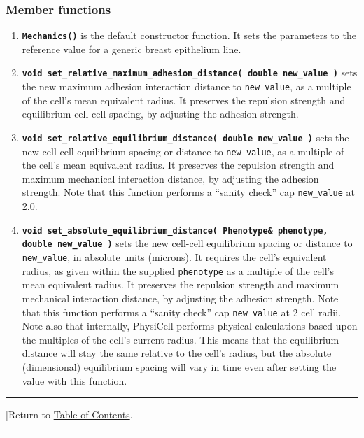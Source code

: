 \documentclass[12pt]{article}
\newcommand{\smallcode}[1]{\textbf{\texttt{#1}}}
\newcommand{\TOClink}{\begin{center}\hrule\vskip-10pt\phantom{.}\hfill[Return to \hyperlink{TOC}{Table of Contents}.]\hfill\phantom{.}\vskip3pt\hrule\end{center}}
\begin{document}
\subsubsection{Member functions}
\begin{enumerate}
\item 
\smallcode{Mechanics()} is the default constructor function. It sets the parameters to the reference value for 
a generic breast epithelium line.  


\item
\smallcode{void set\_relative\_maximum\_adhesion\_distance( double new\_value )} sets the new maximum 
adhesion interaction distance to \texttt{new\_value}, as a multiple of the cell's mean equivalent radius. It 
preserves the repulsion strength and equilibrium cell-cell spacing, by adjusting the adhesion strength. 

\item 
\smallcode{void set\_relative\_equilibrium\_distance( double new\_value )} sets the new cell-cell equilibrium 
spacing or distance to \texttt{new\_value}, as a multiple of the cell's mean equivalent radius. It 
preserves the repulsion strength and maximum mechanical interaction distance, 
by adjusting the adhesion strength. Note that this function performs a ``sanity check'' cap 
\texttt{new\_value} at 2.0. 


\item 
\smallcode{void set\_absolute\_equilibrium\_distance( Phenotype\& phenotype, double new\_value )}
 sets the new cell-cell equilibrium 
spacing or distance to \texttt{new\_value}, in absolute units (microns). It requires the cell's 
equivalent radius, as given within the supplied \texttt{phenotype}
 as a multiple of the cell's mean equivalent radius. It 
preserves the repulsion strength and maximum mechanical interaction distance, 
by adjusting the adhesion strength.  Note that this function performs a ``sanity check'' cap 
\texttt{new\_value} at 2 cell radii. Note also that internally, PhysiCell performs physical calculations 
based upon the multiples of the cell's current radius. This means that the equilibrium distance will 
stay the same relative to the cell's radius, but the absolute (dimensional) equilibrium spacing will 
vary in time even after setting the value with this function. 

\end{enumerate}

\TOClink
\end{document}
